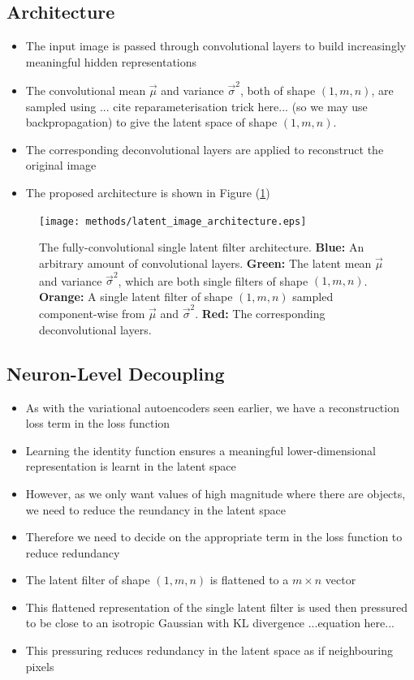 \subsection{Architecture}
\begin{itemize}
\item The input image is passed through convolutional layers to build increasingly meaningful hidden representations
\item The convolutional mean $\vec{\mu}$ and variance $\vec{\sigma}^2$, both of shape $(1, m, n)$, are sampled using ... cite reparameterisation trick here... (so we may use backpropagation) to give the latent space of shape $(1, m, n)$. 
\item The corresponding deconvolutional layers are applied to reconstruct the original image
\item The proposed architecture is shown in Figure (\ref{fig:latent_image_architecture})
\end{itemize}

\begin{figure}[H]
\centering
\captionsetup{justification=centering}
\texttt{[image: methods/latent\_image\_architecture.eps]}
\caption{The fully-convolutional single latent filter architecture. \textbf{Blue:} An arbitrary amount of convolutional layers. \textbf{Green:} The latent mean $\vec{\mu}$ and variance $\vec{\sigma}^2$, which are both single filters of shape $(1, m, n)$. \textbf{Orange:} A single latent filter of shape $(1, m, n)$ sampled component-wise from $\vec{\mu}$ and $\vec{\sigma}^2$. \textbf{Red:} The corresponding deconvolutional layers.}
\label{fig:latent_image_architecture}
\end{figure}

%
%
\subsection{Neuron-Level Decoupling}
\begin{itemize}
\item As with the variational autoencoders seen earlier, we have a reconstruction loss term in the loss function
\item Learning the identity function ensures a meaningful lower-dimensional representation is learnt in the latent space
\item However, as we only want values of high magnitude where there are objects, we need to reduce the reundancy in the latent space
\item Therefore we need to decide on the appropriate term in the loss function to reduce redundancy
\item The latent filter of shape $(1, m, n)$ is flattened to a $m \times n$ vector
\item This flattened representation of the single latent filter is used then pressured to be close to an isotropic Gaussian with KL divergence ...equation here...
\item This pressuring reduces redundancy in the latent space as if neighbouring pixels 
\end{itemize}

